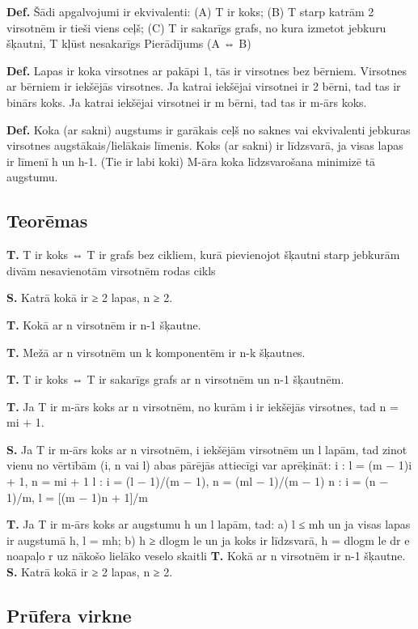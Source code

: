 \documentclass{article}
\begin{document}
\textbf{Def.}  Šādi apgalvojumi ir ekvivalenti: (A) T ir koks; (B) T starp katrām 2 virsotnēm ir tieši viens ceļš; (C) T ir sakarīgs grafs, no kura izmetot jebkuru šķautni, T kļūst nesakarīgs Pierādījums (A ⇔ B)


\textbf{Def.}  Lapas ir koka virsotnes ar pakāpi 1, tās ir virsotnes bez bērniem.  Virsotnes ar bērniem ir iekšējās virsotnes.  Ja katrai iekšējai virsotnei ir 2 bērni, tad tas ir binārs koks.  Ja katrai iekšējai virsotnei ir m bērni, tad tas ir m-ārs koks.

\textbf{Def.}  Koka (ar sakni) augstums ir garākais ceļš no saknes vai ekvivalenti jebkuras virsotnes augstākais/lielākais līmenis.  Koks (ar sakni) ir līdzsvarā, ja visas lapas ir līmenī h un h-1. (Tie ir labi koki) M-āra koka līdzsvarošana minimizē tā augstumu.

\subsection{Teorēmas}

\textbf{T. } T ir koks ⇔ T ir grafs bez cikliem, kurā pievienojot šķautni starp jebkurām divām
nesavienotām virsotnēm rodas cikls

\textbf{S. } Katrā kokā ir ≥ 2 lapas, n ≥ 2.

\textbf{T. } Kokā ar n virsotnēm ir n-1 šķautne.

\textbf{T. } Mežā ar n virsotnēm un k komponentēm ir n-k šķautnes.

\textbf{T. } T ir koks ⇔ T ir sakarīgs grafs ar n virsotnēm un n-1 šķautnēm.

\textbf{T. } Ja T ir m-ārs koks ar n virsotnēm, no kurām i ir iekšējās virsotnes, tad n = mi + 1.

\textbf{S. } Ja T ir m-ārs koks ar n virsotnēm, i iekšējām virsotnēm un l lapām, tad zinot vienu no vērtībām (i, n vai l) abas pārējās attiecīgi var aprēķināt:
i : l = (m − 1)i + 1, n = mi + 1
l : i = (l − 1)/(m − 1), n = (ml − 1)/(m − 1)
n : i = (n − 1)/m, l = [(m − 1)n + 1]/m


\textbf{T. } Ja T ir m-ārs koks ar augstumu h un l lapām, tad: a) l ≤ mh un ja visas lapas ir augstumā h, l = mh; b) h ≥ dlogm le un ja koks ir līdzsvarā, h = dlogm le dr e noapaļo r uz nākošo lielāko veselo skaitli
\textbf{T. } Kokā ar n virsotnēm ir n-1 šķautne.
\textbf{S. } Katrā kokā ir ≥ 2 lapas, n ≥ 2.

\subsection{Prūfera virkne}
\end{document}
